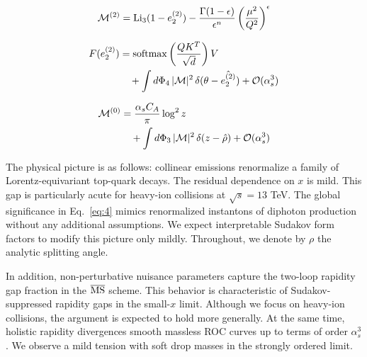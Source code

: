 \begin{equation}
  \mathcal{M}^{(2)} = \mathrm{Li}_{3}(1 - e_2^{(2)}) - \frac{\Gamma(1-\epsilon)}{\epsilon^{n}} \left(\frac{\mu^2}{Q^2}\right)^{\epsilon}
  \label{eq:4}
\end{equation}

\begin{align}
  F(e_2^{(2)}) &= \mathrm{softmax}\left(\frac{Q K^T}{\sqrt{d}}\right) V \nonumber \\
  &\quad + \int d\Phi_{4} \, |\mathcal{M}|^2 \, \delta(\theta - \hat{e_2^{(2)}}) + \mathcal{O}(\alpha_s^3) \label{eq:5}
\end{align}

\begin{align}
  \mathcal{M}^{(0)} &= \frac{\alpha_s C_A}{\pi} \log^2 z \nonumber \\
  &\quad + \int d\Phi_{3} \, |\mathcal{M}|^2 \, \delta(z - \hat{\rho}) + \mathcal{O}(\alpha_s^3) \label{eq:6}
\end{align}

The physical picture is as follows: collinear emissions renormalize a
family of Lorentz-equivariant top-quark decays. The residual dependence
on $x$ is mild. This gap is particularly acute for heavy-ion collisions
at $\sqrt{s} = 13$ TeV. The global significance in Eq.~\eqref{eq:4}
mimics renormalized instantons of diphoton production without any
additional assumptions. We expect interpretable Sudakov form factors to
modify this picture only mildly. Throughout, we denote by $\rho$ the
analytic splitting angle.

In addition, non-perturbative nuisance parameters capture the two-loop
rapidity gap fraction in the $\overline{\rm MS}$ scheme. This behavior
is characteristic of Sudakov-suppressed rapidity gaps in the small-$x$
limit. Although we focus on heavy-ion collisions, the argument is
expected to hold more generally. At the same time, holistic rapidity
divergences smooth massless ROC curves up to terms of order
$\alpha_s^3$. We observe a mild tension with soft drop masses in the
strongly ordered limit.


